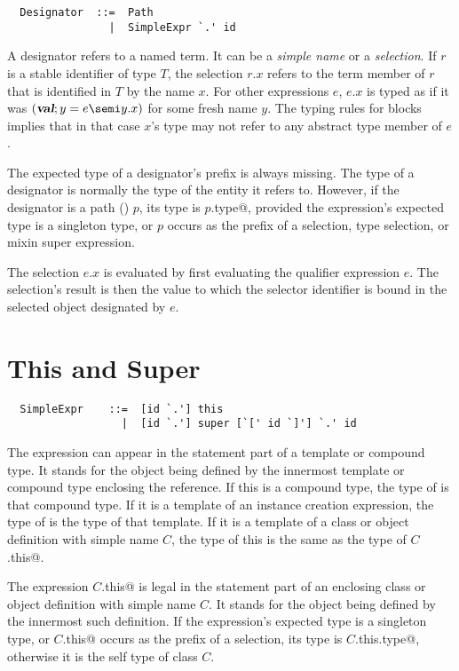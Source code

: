 \documentclass[a4paper,12pt,twoside,titlepage]{book}
\begin{document}
\syntax\begin{lstlisting}
  Designator  ::=  Path
                |  SimpleExpr `.' id
\end{lstlisting}

A designator refers to a named term. It can be a {\em simple name} or
a {\em selection}. If $r$ is a stable identifier of type $T$, the
selection $r.x$ refers to the term member of $r$ that is identified in
$T$ by the name $x$.  For other expressions $e$, $e.x$ is typed as if
it was $(\VAL;y=e\semi y.x)$ for some fresh name $y$. The typing rules
for blocks implies that in that case $x$'s type may not refer to any
abstract type member of $e$.

The expected type of a designator's prefix is always missing.
The
type of a designator is normally the type of the entity it refers
to. However, if the designator is a path () $p$,
its type is \lstinline@$p$.type@, provided the expression's expected type is
a singleton type, or $p$ occurs as the prefix of a selection,
type selection, or mixin super expression.

The selection $e.x$ is evaluated by first evaluating the qualifier
expression $e$. The selection's result is then the value to which the
selector identifier is bound in the selected object designated by $e$.

\section{This and Super}
\label{sec:this-super}

\syntax\begin{lstlisting}
  SimpleExpr    ::=  [id `.'] this
                  |  [id `.'] super [`[' id `]'] `.' id
\end{lstlisting}

The expression  can appear in the statement part of a
template or compound type. It stands for the object being defined by
the innermost template or compound type enclosing the reference. If
this is a compound type, the type of  is that compound type.
If it is a template of an instance creation expression, the type of
 is the type of that template. If it is a template of a
class or object definition with simple name $C$, the type of this
is the same as the type of \lstinline@$C$.this@.

The expression \lstinline@$C$.this@ is legal in the statement part of an
enclosing class or object definition with simple name $C$. It
stands for the object being defined by the innermost such definition.
If the expression's expected type is a singleton type, or
\lstinline@$C$.this@ occurs as the prefix of a selection, its type is
\lstinline@$C$.this.type@, otherwise it is the self type of class $C$.
\end{document}
